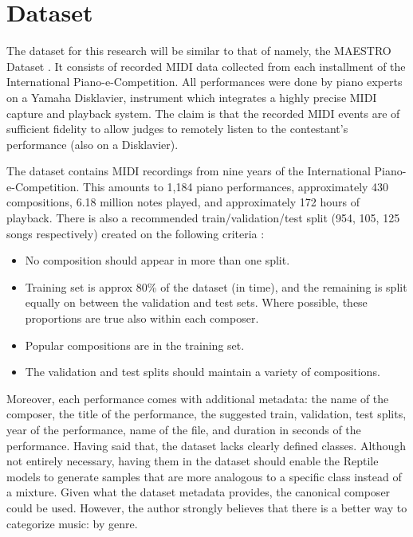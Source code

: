 \documentclass[a4paper]{book}
\begin{document}
\section{Dataset} \label{sec:dataset}

The dataset for this research will be similar to that of \textcite{oore_this_2018} namely, the MAESTRO Dataset \parencite{hawthorne_enabling_2018}. It consists of recorded MIDI data collected from each installment of the International Piano-e-Competition. All performances were done by piano experts on a Yamaha Disklavier, instrument which integrates a highly precise MIDI capture and playback system. The claim is that the recorded MIDI events are of sufficient fidelity to allow judges to remotely listen to the contestant's performance (also on a Disklavier).

The dataset contains MIDI recordings from nine years of the International Piano-e-Competition. This amounts to 1,184 piano performances, approximately 430 compositions, 6.18 million notes played, and approximately 172 hours of playback. There is also a recommended train/validation/test split (954, 105, 125 songs respectively) created on the following criteria \parencite{hawthorne_enabling_2018}:

\begin{itemize}
    \item No composition should appear in more than one split.
    \item Training set is approx 80\% of the dataset (in time), and the remaining is split equally on between the validation and test sets. Where possible, these proportions are true also within each composer.
    \item Popular compositions are in the training set.
    \item The validation and test splits should maintain a variety of compositions.
\end{itemize}

Moreover, each performance comes with additional metadata: the name of the composer, the title of the performance, the suggested train, validation, test splits, year of the performance, name of the file, and duration in seconds of the performance. Having said that, the dataset lacks clearly defined classes. Although not entirely necessary, having them in the dataset should enable the Reptile models to generate samples that are more analogous to a specific class instead of a mixture. Given what the dataset metadata provides, the canonical composer could be used. However, the author strongly believes that there is a better way to categorize music: by genre.
\end{document}
